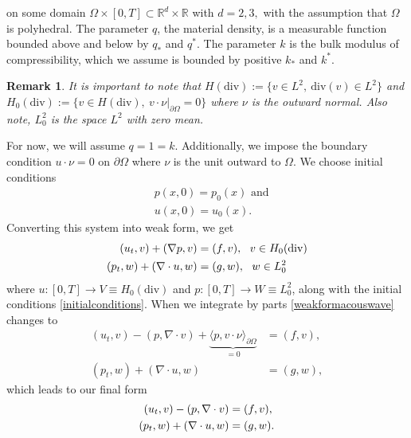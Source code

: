 \documentclass[11pt]{article}
\newtheorem{remark}{Remark}[section]
\newcommand{\R}{\mathbb{R}}
\newcommand{\divv}{\mathrm{div}}
\begin{document}
on some domain $\Omega \times [0,T] \subset \R^d \times \R$ with $d = 2,3,$ with the assumption that $\Omega$ is polyhedral. The parameter $q$, the material density, is a measurable function bounded above and below by $q_*$ and $q^*$. The parameter $k$ is the bulk modulus of compressibility, which we assume is bounded by positive $k_*$ and $k^*$.
\begin{remark}
	It is important to note that $H(\divv):= \{v \in L^2,\: \divv(v) \in L^2\}$ and $H_0(\divv) := \{ v\in H(\divv),\: v \cdot \nu|_{\partial \Omega} = 0 \}$ where $\nu$ is the outward normal. Also note, $L^2_0$ is the space $L^2$ with zero mean.
\end{remark}
For now, we will assume $q = 1 = k$. Additionally, we impose the boundary condition $u \cdot \nu = 0$ on $\partial\Omega$ where $\nu$ is the unit outward to $\Omega$. We choose initial conditions
\begin{equation}\label{initialconditions}
\begin{split}
&p(x,0) = p_0(x) \text{ and}\\
&u(x,0) = u_0(x).
\end{split}
\end{equation}
Converting this system into weak form, we get
\begin{equation}{\label{weakformacouswave}}
\begin{split}
(u_t,v) + (\nabla p,v) &= (f,v), \:\:\: v \in H_0(\divv) \\
(p_t, w) + (\nabla \cdot u,w) &= (g,w), \:\:\: w \in L_0^2
\end{split}
\end{equation}
where $u:[0,T] \rightarrow V \equiv H_0(\divv)$ and $p:[0,T] \rightarrow W \equiv L_0^2$, %
 along with the initial conditions \eqref{initialconditions}.
When we integrate by parts \eqref{weakformacouswave} changes to 
\begin{equation}
\begin{split}
(u_t,v) - (p,\nabla \cdot v) + \underbrace{\langle p, v \cdot \nu \rangle_{\partial\Omega}}_{=0} &= (f,v), \\
(p_t, w) + (\nabla \cdot u,w) &= (g,w),
\end{split}
\end{equation}
which leads to our final form 
\begin{equation}{\label{finalformacouswave}}
\begin{split}
(u_t,v) - (p,\nabla \cdot v) &= (f,v),\\
(p_t, w) + (\nabla \cdot u,w) &= (g,w).
\end{split}
\end{equation}
\end{document}
